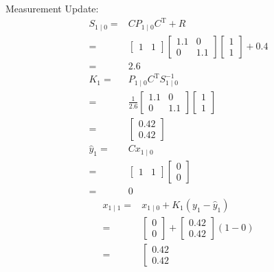 \documentclass[twoside]{article}
\renewcommand{\t}{^\mathrm{T}{}}
\begin{document}
\begin{itemize}
	Measurement Update:
	\begin{align*}
		S_{1\mid 0} =& C P_{1\mid0}C\t+R\\
		=& \left[\begin{array}{cc}
			1 & 1
		\end{array} \right] \left[ \begin{array}{cc}
		1.1 & 0 \\ 0 & 1.1
	\end{array}\right]\left[ \begin{array}{c}
	1 \\ 1
	\end{array}\right] + 0.4\\
	 =& 2.6\\
	 K_1 =& P_{1\mid0}C\t S^{-1}_{1\mid0}\\
	 =&\frac{1}{2.6}\left[ \begin{array}{cc}
	 	1.1 & 0 \\ 0 & 1.1
	 \end{array}\right]\left[ \begin{array}{c}
	 1 \\ 1
	 \end{array}\right]\\
	=& \left[ \begin{array}{c}
		0.42 \\ 0.42
	\end{array}\right]\\
	\hat y_1 =& C x_{1\mid0}\\
	=& \left[\begin{array}{cc}
		1 & 1
	\end{array} \right] \left[ \begin{array}{c}
	0 \\ 0
	\end{array}\right] \\
	=& 0
\end{align*}
\begin{align*}
	x_{1\mid1} =& x_{1\mid0}+K_1(y_1-\hat y_1)\\
	=& \left[ \begin{array}{c}
		0 \\ 0
	\end{array}\right] + \left[ \begin{array}{c}
	0.42 \\ 0.42
	\end{array}\right] (1-0)\\
	 =&\left[ \begin{array}{c}
		0.42 \\ 0.42

\end{array}
\end{align*}
\end{itemize}
\end{document}

